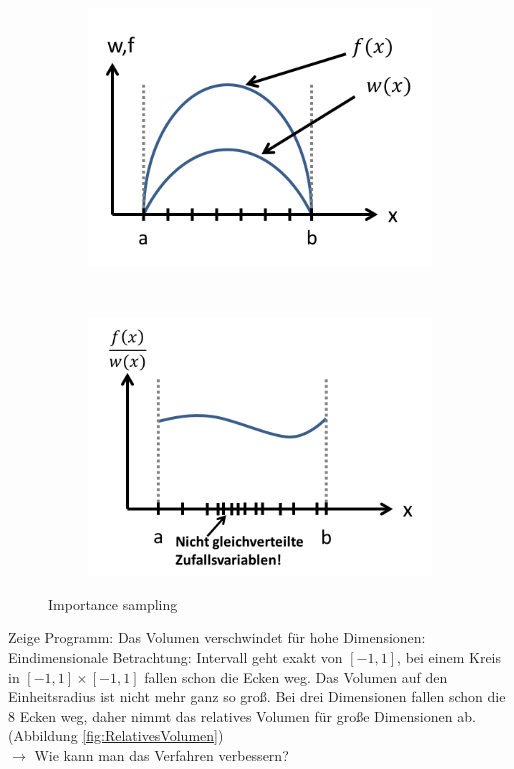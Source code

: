 \documentclass[12pt]{article}
\begin{document}
\begin{figure}[h] 
		\begin{subfigure}[h]{0.5 \textwidth}
		\centering
		\includegraphics[width=\textwidth]{Folie20.png}
		\caption{} 
		\centering
	\end{subfigure}
	~
\begin{subfigure}[h]{0.5\textwidth}
		\centering
		\includegraphics[width=\textwidth]{Folie21.png}
		\caption{}
		\centering
	\end{subfigure}
	\caption{ Importance sampling}
	\label{fig:Funktion}
\end{figure}
	
 


Zeige Programm: Das Volumen verschwindet für hohe Dimensionen: Eindimensionale Betrachtung: Intervall geht exakt von $[-1,1]$, bei einem Kreis in $[-1,1] \times [-1,1]$ fallen schon die Ecken weg. Das Volumen auf den Einheitsradius ist nicht mehr ganz so groß. Bei drei Dimensionen fallen schon die 8 Ecken weg, daher nimmt das relatives Volumen für große Dimensionen ab. (Abbildung \ref{fig:RelativesVolumen}) \\
$\to$ Wie kann man das Verfahren verbessern?
\end{document}
